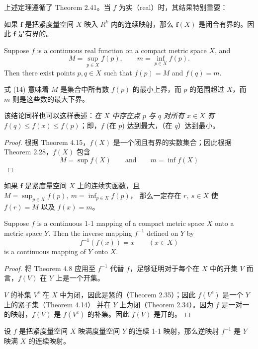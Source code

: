 \documentclass[../poma-notes.tex]{subfiles}
\begin{document}
上述定理遵循了 Theorem 2.41。当 $f$ 为实（real）时，其结果特别重要：

\begin{anote}
  如果 $\mathbf{f}$ 是把紧度量空间 $X$ 映入 $R^k$ 内的连续映射，那么 $\mathbf{f}(X)$ 是闭合有界的。因此 $\mathbf{f}$
  是有界的。
\end{anote}

\begin{theorem}
  Suppose $f$ is a continuous real function on a compact metric space $X$, and
  \begin{equation}
    M = \sup_{p \in X} f(p), \qquad m = \inf_{p \in X} f(p).
  \end{equation}
  Then there exist points $p, q \in X$ such that $f(p) = M$ and $f(q) = m$.
\end{theorem}

式 (14) 意味着 $M$ 是集合中所有数 $f(p)$ 的最小上界，而 $p$ 的范围超过 $X$，而 $m$ 则是这些数的最大下界。

该结论同样也可以这样表述：\textit{在 $X$ 中存在点 $p$ 与 $q$ 对所有 $x \in X$ 有 $f(q) \le f(x) \le f(p)$}；即，$f$
(在 $p$) 达到最大，（在 $q$）达到最小。

\begin{proof}
  根据 Theorem 4.15，$f(X)$ 是一个闭且有界的实数集合；因此根据 Theorem 2.28，$f(X)$ 包含
  \[
    M = \sup f(X) \qquad \text{and} \qquad m = \inf f(X)
  \]
\end{proof}

\begin{anote}
  如果 $\mathbf{f}$ 是紧度量空间 $X$ 上的连续实函数，且 $M = \sup_{p \in X} f(p),\ m = \inf_{p \in X} f(p)$，
  那么一定存在 $r,\ s \in X$ 使 $f(r) = M$ 以及 $f(x) = m$。
\end{anote}

\begin{theorem}
  Suppose $f$ is a continuous 1-1 mapping of a compact metric space $X$ onto a metric space $Y$. Then the
  inverse mapping $f^{-1}$ defined on $Y$ by
  \[
    f^{-1}(f(x)) = x \qquad (x \in X)
  \]
  is a continuous mapping of $Y$ onto $X$.
\end{theorem}

\begin{proof}
  将 Theorem 4.8 应用至 $f^{-1}$ 代替 $f$，足够证明对于每个在 $X$ 中的开集 $V$ 而言，$f(V)$ 在 $Y$ 上是一个开集。

  $V$ 的补集 $V^c$ 在 $X$ 中为闭，因此是紧的（Theorem 2.35）；因此 $f(V^c)$ 是一个 $Y$ 上的紧子集（Theorem 4.14）
  并在 $Y$ 上为闭（Theorem 2.34）。因为 $f$ 是一对一的映射，$f(V)$ 是 $f(V^c)$ 的补集。因此 $f(V)$ 是开的。
\end{proof}

\begin{anote}
  设 $f$ 是把紧度量空间 $X$ 映满度量空间 $Y$ 的连续 1-1 映射，那么逆映射 $f^{-1}$ 是 $Y$ 映满 $X$ 的连续映射。
\end{anote}

\end{document}
